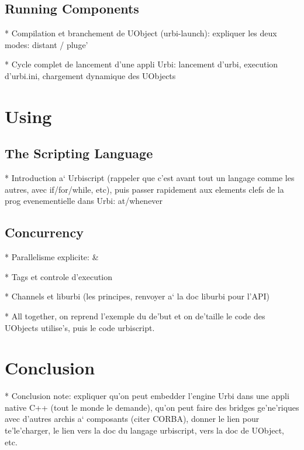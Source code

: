\subsection{Running Components}
\begin{todo}
  * Compilation et branchement de UObject (urbi-launch): expliquer les
  deux modes: distant / pluge'

  * Cycle complet de lancement d'une appli Urbi: lancement d'urbi,
  execution d'urbi.ini, chargement dynamique des UObjects
\end{todo}

\section{Using \us}

\subsection{The \us Scripting Language}
\begin{todo}
  * Introduction a` Urbiscript (rappeler que c'est avant tout un
  langage comme les autres, avec if/for/while, etc), puis passer
  rapidement aux elements clefs de la prog evenementielle dans Urbi:
  at/whenever
\end{todo}

\subsection{Concurrency}
\begin{todo}
  * Parallelisme explicite: \&

  * Tags et controle d'execution

  * Channels et liburbi (les principes, renvoyer a` la doc liburbi pour
  l'API)

  * All together, on reprend l'exemple du de'but et on de'taille le code
  des UObjects utilise's, puis le code urbiscript.
\end{todo}

\section{Conclusion}
\begin{todo}
  * Conclusion note: expliquer qu'on peut embedder l'engine Urbi dans
  une appli native C++ (tout le monde le demande), qu'on peut faire
  des bridges ge'ne'riques avec d'autres archis a` composants (citer
  CORBA), donner le lien pour te'le'charger, le lien vers la doc du
  langage urbiscript, vers la doc de UObject, etc.
\end{todo}


